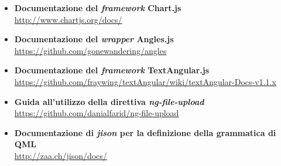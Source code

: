 \begin{itemize}
		\item \textbf{Documentazione del \textit{framework} Chart.js} \\
		\url{http://www.chartjs.org/docs/}
		\item \textbf{Documentazione del \textit{wrapper} Angles.js} \\
		\url{https://github.com/gonewandering/angles}
		\item \textbf{Documentazione del \textit{framework} TextAngular.js} \\
		\url{https://github.com/fraywing/textAngular/wiki/textAngular-Docs-v1.1.x}
		\item \textbf{Guida all'utilizzo della direttiva \textit{ng-file-upload}} \\
		\url{https://github.com/danialfarid/ng-file-upload}
		\item \textbf{Documentazione di \textit{jison} per la definizione della grammatica di QML} \\
		\url{http://zaa.ch/jison/docs/}
	\end{itemize}